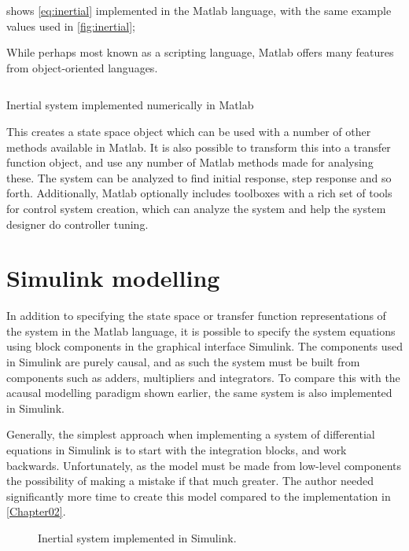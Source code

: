 \documentclass[\rootfolder/main.tex]{subfiles}
\begin{document}
 shows \cref{eq:inertial} implemented in the Matlab language, with the same example values used in \cref{fig:inertial};

While perhaps most known as a scripting language, Matlab offers many features from object-oriented languages.

\begin{listing}[ht]
    \inputminted[fontsize=\footnotesize, firstline=1, lastline=9]{matlab}{\rootfolder/Models/Matlab/InertialMatlab.m}
    \caption{Inertial system implemented numerically in Matlab\label{lst:inertialmatlab}}
\end{listing}

This creates a state space object which can be used with a number of other methods available in Matlab.
It is also possible to transform this into a transfer function object, and use any number of Matlab methods made for analysing these.
The system can be analyzed to find initial response, step response and so forth.
Additionally, Matlab optionally includes toolboxes with a rich set of tools for control system creation, which can analyze the system and help the system designer do controller tuning.

\section{Simulink modelling}

In addition to specifying the state space or transfer function representations of the system in the Matlab language, it is possible to specify
the system equations using block components in the graphical interface Simulink.
The components used in Simulink are purely causal, and as such the system must be built from components such as adders, multipliers and integrators.
To compare this with the acausal modelling paradigm shown earlier, the same system is also implemented in Simulink.

Generally, the simplest approach when implementing a system of differential equations in Simulink is to start with the integration blocks, and work backwards.
Unfortunately, as the model must be made from low-level components the possibility of making a mistake if that much greater.
The author needed significantly more time to create this model compared to the implementation in \ref{Chapter02}.

\begin{figure}[ht]
    \centering
    \tiny
    
    \caption{Inertial system implemented in Simulink.\label{fig:inertial-simulink}}
\end{figure}
\end{document}
